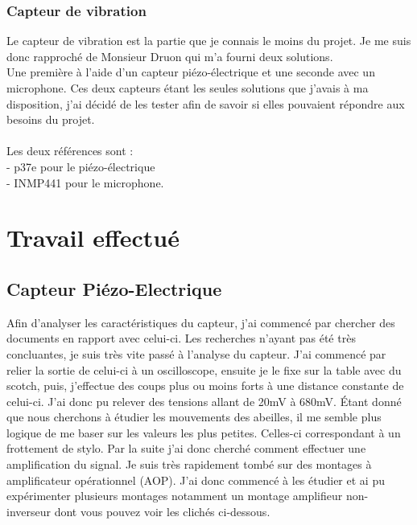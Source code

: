 \documentclass[12pt]{article}
\begin{document}
\subsubsection{Capteur de vibration}
Le capteur de vibration est la partie que je connais le moins du projet. Je me suis donc rapproché de Monsieur Druon qui m’a fourni deux solutions.\\
 Une première à l'aide d'un capteur piézo-électrique et une seconde avec un  microphone. Ces deux capteurs étant les seules solutions que j'avais à ma disposition, 
 j'ai décidé de les tester afin de savoir si elles pouvaient répondre aux besoins du projet.\\
\\
 Les deux références sont :\\
- p37e pour le piézo-électrique\\
- INMP441 pour le microphone.\\

\section{Travail effectué}
\subsection{Capteur Piézo-Electrique}

Afin d'analyser les caractéristiques du capteur, j'ai commencé par chercher des documents en rapport avec celui-ci. Les recherches n'ayant pas 
été très concluantes, je suis très vite passé à l'analyse du capteur. J'ai commencé par relier la sortie de celui-ci à un oscilloscope, ensuite je le fixe
sur la table avec du scotch, puis, j'effectue des coups plus ou moins forts à une distance constante de celui-ci. J'ai donc pu relever des tensions allant de 20mV à 680mV.
Étant donné que nous cherchons à étudier les mouvements des abeilles, il me semble plus logique de me baser sur les valeurs les plus petites. Celles-ci correspondant à un frottement de stylo.
Par la suite j'ai donc cherché comment effectuer une amplification du signal. Je suis très rapidement tombé sur des montages à amplificateur opérationnel (AOP). J'ai donc commencé
à les étudier et ai pu expérimenter plusieurs montages notamment un montage amplifieur non-inverseur dont vous pouvez voir les clichés ci-dessous.
\end{document}
